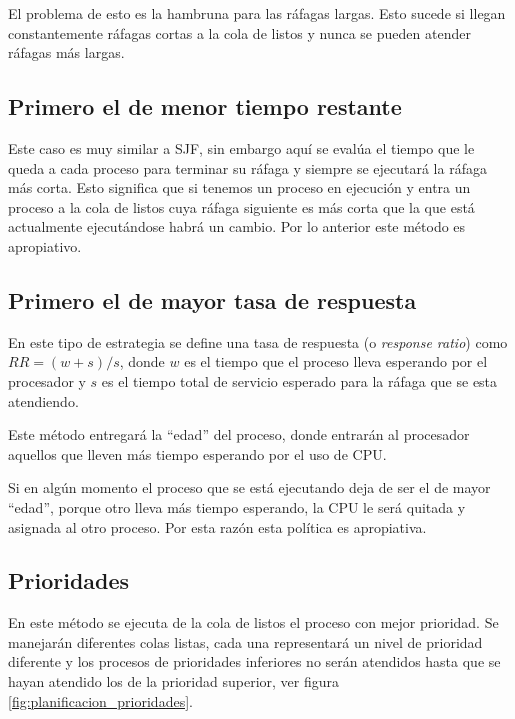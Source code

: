 El problema de esto es la hambruna para las ráfagas largas. Esto sucede si
llegan constantemente ráfagas cortas a la cola de listos y nunca se pueden
atender ráfagas más largas.

\subsection{Primero el de menor tiempo restante}
Este caso es muy similar a SJF, sin embargo aquí se evalúa el tiempo que le
queda a cada proceso para terminar su ráfaga y siempre se ejecutará la ráfaga
más corta. Esto significa que si tenemos un proceso en ejecución y entra un
proceso a la cola de listos cuya ráfaga siguiente es más corta que la que está
actualmente ejecutándose habrá un cambio. Por lo anterior este método es
apropiativo.

\subsection{Primero el de mayor tasa de respuesta}
En este tipo de estrategia se define una tasa de respuesta (o \textit{response
ratio}) como $RR = (w + s) / s$, donde $w$ es el tiempo que el proceso lleva
esperando por el procesador y $s$ es el tiempo total de servicio esperado para
la ráfaga que se esta atendiendo.

Este método entregará la ``edad'' del proceso, donde entrarán al procesador
aquellos que lleven más tiempo esperando por el uso de CPU.

Si en algún momento el proceso que se está ejecutando deja de ser el de mayor
``edad'', porque otro lleva más tiempo esperando, la CPU le será quitada y
asignada al otro proceso. Por esta razón esta política es apropiativa.

\subsection{Prioridades}
En este método se ejecuta de la cola de listos el proceso con mejor prioridad.
Se manejarán diferentes colas listas, cada una representará un nivel de
prioridad diferente y los procesos de prioridades inferiores no serán atendidos
hasta que se hayan atendido los de la prioridad superior, ver figura
\ref{fig:planificacion_prioridades}.

